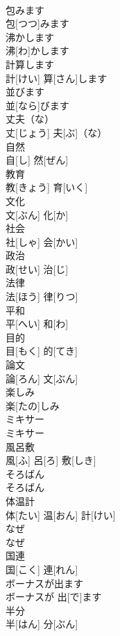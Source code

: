 \documentclass[8pt]{extreport}
\begin{document}
\begin{CJK}{UTF8}{min}
\\	包みます	
\\	包[つつ]みます		
\\	沸かします	
\\	沸[わ]かします		
\\	計算します	
\\	計[けい] 算[さん]します		
\\	並びます	
\\	並[なら]びます		
\\	丈夫（な）	
\\	丈[じょう] 夫[ぶ]（な）		
\\	自然	
\\	自[し] 然[ぜん]		
\\	教育	
\\	教[きょう] 育[いく]		
\\	文化	
\\	文[ぶん] 化[か]		
\\	社会	
\\	社[しゃ] 会[かい]		
\\	政治	
\\	政[せい] 治[じ]		
\\	法律	
\\	法[ほう] 律[りつ]		
\\	平和	
\\	平[へい] 和[わ]		
\\	目的	
\\	目[もく] 的[てき]		
\\	論文	
\\	論[ろん] 文[ぶん]		
\\	楽しみ	
\\	楽[たの]しみ		
\\	ミキサー	
\\	ミキサー		
\\	風呂敷	
\\	風[ふ] 呂[ろ] 敷[しき]		
\\	そろばん	
\\	そろばん		
\\	体温計	
\\	体[たい] 温[おん] 計[けい]		
\\	なぜ	
\\	なぜ		
\\	国連	
\\	国[こく] 連[れん]		
\\	ボーナスが出ます	
\\	ボーナスが 出[で]ます		
\\	半分	
\\	半[はん] 分[ぶん]		

\end{CJK}
\end{document}
